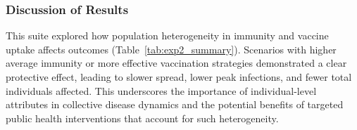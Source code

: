 \documentclass[12pt]{article}
\begin{document}
\begin{table}[H]
\centering
\caption{Summary Metrics for Experiment Suite 2: Heterogeneity}
\label{tab:exp2_summary}
\end{table}

\subsubsection*{Discussion of Results}
This suite explored how population heterogeneity in immunity and vaccine uptake affects outcomes (Table~\ref{tab:exp2_summary}). Scenarios with higher average immunity or more effective vaccination strategies demonstrated a clear protective effect, leading to slower spread, lower peak infections, and fewer total individuals affected. This underscores the importance of individual-level attributes in collective disease dynamics and the potential benefits of targeted public health interventions that account for such heterogeneity.
\end{document}
